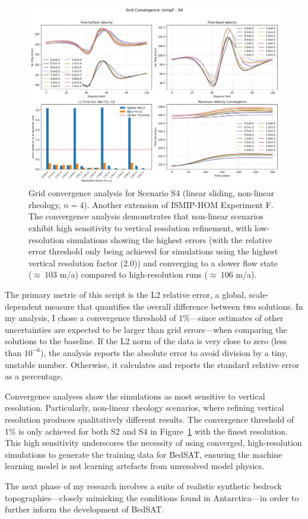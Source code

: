 \begin{figure}[H]
    \includegraphics[scale=0.40]{figures/IsmipF_S4_convergence_summary.png}
    \caption{Grid convergence analysis for Scenario S4 (linear sliding, non-linear rheology, $n=4$). Another extension of ISMIP-HOM Experiment F. The convergence analysis demonstrates that non-linear scenarios exhibit high sensitivity to vertical resolution refinement, with low-resolution simulations showing the highest errors (with the relative error threshold only being achieved for simulations using the highest vertical resolution factor (2.0)) and converging to a slower flow state ($\approx~103$ m/a) compared to high-resolution runs ($\approx~106$ m/a).}
    \label{fig:grid_conv_S4}
\end{figure}
The primary metric of this script is the L2 relative error, a global, scale-dependent measure that quantifies the overall difference between two solutions. In my analysis, I chose a convergence threshold of $1\%$—since estimates of other uncertainties are expected to be larger than grid errors—when comparing the solutions to the baseline. If the L2 norm of the data is very close to zero (less than $10^{-6}$), the analysis reports the absolute error to avoid division by a tiny, unstable number. Otherwise, it calculates and reports the standard relative error as a percentage.

Convergence analyses show the simulations as most sensitive to vertical resolution. Particularly, non-linear rheology scenarios, where refining vertical resolution produces qualitatively different results. The convergence threshold of 1\% is only achieved for both S2 and S4 in Figure~\ref{fig:grid_conv_S4} with the finest resolution. This high sensitivity underscores the necessity of using converged, high-resolution simulations to generate the training data for BedSAT, ensuring the machine learning model is not learning artefacts from unresolved model physics.

The next phase of my research involves a suite of realistic synthetic bedrock topographies—closely mimicking the conditions found in Antarctica—in order to further inform the development of BedSAT.